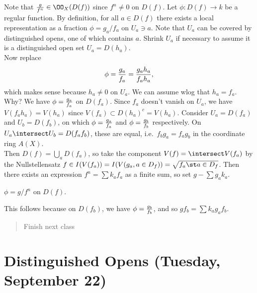 \begin{proposition}[?]

Note that \({g\over f^n} \in \OO_X(D(f))\) since \(f^n\neq 0\) on
\(D(f)\). Let \(\phi: D(f) \to k\) be a regular function. By definition,
for all \(a\in D(f)\) there exists a local representation as a fraction
\(\phi = g_a/f_a\) on \(U_a\ni a\). Note that \(U_a\) can be covered by
distinguished opens, one of which contains \(a\). Shrink \(U_a\) if
necessary to assume it is a distinguished open set \(U_a = D(h_a)\).\\

Now replace
\begin{align*}  
\phi = {g_a \over f_a} = {g_a h_a \over f_a h_a}
,\end{align*} which makes sense because \(h_a\neq 0\) on \(U_a\). We can
assume wlog that \(h_a = f_a\). Why? We have \(\phi = {g_a \over f_a}\)
on \(D(f_a)\). Since \(f_a\) doesn't vanish on \(U_a\), we have
\(V(f_a h_a) = V(h_a)\) since \(V(f_a) \subset D(h_a)^c = V(h_a)\).
Consider \(U_a = D(f_a)\) and \(U_b = D(f_b)\), on which
\(\phi = {g_a\over f_a}\) and \(\phi = {g_b \over f_b}\) respectively.
On \(U_a\intersect U_b = D(f_a f_b)\), these are equal,
i.e.~\(f_b g_a = f_a g_b\) in the coordinate ring \(A(X)\).\\

Then \(D(f) = \bigcup_a D(f_a)\), so take the component
\(V(f) = \intersect V(f_a)\) by the Nullstellensatz
\(f\in I(V(f_a)) = I(V(g_a, a\in D_f)) = \sqrt{f_a \st a\in D_f}\). Then
there exists an expression \(f^n = \sum k_a f_a\) as a finite sum, so
set \(g - \sum g_a k_a\).

\begin{claim}

\(\phi = g/f^n\) on \(D(f)\).

\end{claim}

This follows because on \(D(f_b)\), we have \(\phi = {g_b \over f_b}\),
and so \(gf_b = \sum k_a g_a f_b\).

\begin{quote}
Finish next class
\end{quote}

\end{proposition}

\hypertarget{distinguished-opens-tuesday-september-22}{%
\section{Distinguished Opens (Tuesday, September
22)}\label{distinguished-opens-tuesday-september-22}}


